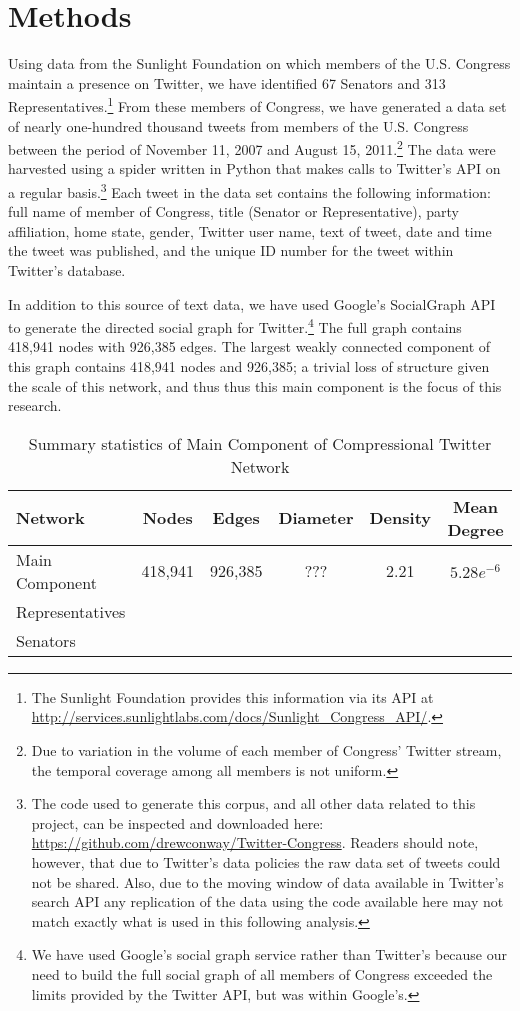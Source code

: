 \documentclass[11pt]{article}
\begin{document}
\section{Methods}
Using data from the Sunlight Foundation on which members of the U.S. Congress maintain a presence on Twitter, we have identified 67 Senators and 313 Representatives.\footnote{The Sunlight Foundation provides this information via its API at \url{http://services.sunlightlabs.com/docs/Sunlight_Congress_API/}.} From these members of Congress, we have generated a data set of nearly one-hundred thousand tweets from members of the U.S. Congress between the period of November 11, 2007 and August 15, 2011.\footnote{Due to variation in the volume of each member of Congress' Twitter stream, the temporal coverage among all members is not uniform.}  The data were harvested using a spider written in Python that makes calls to Twitter's API on a regular basis.\footnote{The code used to generate this corpus, and all other data related to this project, can be inspected and downloaded here: \url{https://github.com/drewconway/Twitter-Congress}.  Readers should note, however, that due to Twitter's data policies the raw data set of tweets could not be shared.  Also, due to the moving window of data available in Twitter's search API any replication of the data using the code available here may not match exactly what is used in this following analysis.}  Each tweet in the data set contains the following information: full name of member of Congress, title (Senator or Representative), party affiliation, home state, gender, Twitter user name, text of tweet, date and time the tweet was published, and the unique ID number for the tweet within Twitter's database.

In addition to this source of text data, we have used Google's SocialGraph API to generate the directed social graph for Twitter.\footnote{We have used Google's social graph service rather than Twitter's because our need to build the full social graph of all members of Congress exceeded the limits provided by the Twitter API, but was within Google's.} The full graph contains 418,941 nodes with 926,385 edges.  The largest weakly connected component of this graph contains 418,941 nodes and 926,385; a trivial loss of structure given the scale of this network, and thus thus this main component is the focus of this research.  

\begin{table}
    \centering
    \caption{Summary statistics of Main Component of Compressional Twitter Network}
    \begin{tabular}{|l|c|c|c|c|c|}
        \hline
        Network & Nodes & Edges & Diameter & Density & Mean Degree \\ \hline
        Main Component & 418,941 & 926,385 & ??? & 2.21 & $5.28e^{-6}$ \\
        Representatives & & & & & \\
        Senators & & & & & \\ \hline
    \end{tabular}
\end{table}
\end{document}
